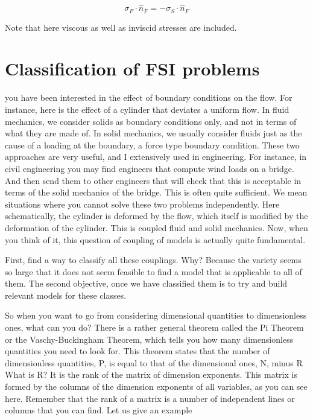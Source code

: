 \begin{equation}
\sigma_F \cdot \hat{n}_F = -\sigma_S \cdot \hat{n}_F
\end{equation}

Note that here viscous as well as inviscid stresses are included.

\section{Classification of FSI problems}
\label{sec:classification}
you have been interested in the effect of boundary conditions on the flow. For instance, here is the effect of a cylinder that deviates a uniform flow. In fluid mechanics, we consider solids as boundary conditions only,
and not in terms of what they are made of.
In solid mechanics, we usually consider fluids just as the cause of a loading at the boundary, a force type boundary condition. These two approaches are very useful, and I extensively used in engineering. For instance, in civil engineering you may find engineers that compute wind loads on a bridge. And then send them to other engineers that will check that this is acceptable in terms of the solid mechanics of the bridge. This is often quite sufficient.
We mean situations where you cannot solve these two problems independently.
Here schematically, the cylinder is deformed by the flow, which itself is modified by the deformation of the cylinder. This is coupled fluid and solid mechanics. Now, when you think of it, this question of coupling of models is actually quite fundamental.

First, find a way to classify all these couplings. Why? Because the variety seems so large that it does not seem feasible to find a model that is applicable to all of them. The second objective, once we have classified them is to try and build relevant models for these classes.

So when you want to go from considering dimensional quantities to dimensionless ones, what can you do?
There is a rather general theorem called the Pi Theorem or the Vaschy-Buckingham Theorem, which tells you how many dimensionless quantities you need to look for.
This theorem states that the number of dimensionless quantities, P, is equal to that of the dimensional ones, N, minus R
What is R? It is the rank of the matrix of dimension exponents. This matrix is formed by the columns of the dimension exponents of all variables, as you can see here. Remember that the rank of a matrix is a number of independent lines or columns that you can find. Let us give an example


